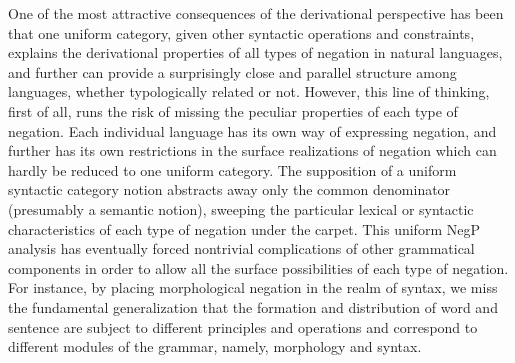 \documentclass[output=paper]{langsci/langscibook}
\begin{document}
One of the most attractive consequences of the
derivational perspective has been that one uniform category,
given other syntactic operations and constraints,
explains the derivational properties of all types of negation
in natural languages, and further can provide a surprisingly
close and parallel structure among languages, whether typologically
related or not. However, this line of thinking, first of all, runs the risk of
missing the peculiar properties of each type of
negation. Each individual language has its own
way of expressing negation, and further has
its own restrictions in the surface realizations of negation which
can hardly be reduced to one uniform category.
%
The supposition of a uniform syntactic category
notion abstracts away only the
common denominator  (presumably a semantic notion), sweeping the
particular lexical or syntactic characteristics of each type of negation
under the carpet. This uniform NegP analysis has eventually forced
nontrivial complications of other grammatical components
in order to allow all the surface
possibilities of each type of negation. For instance,
by placing morphological negation in the realm of syntax, we
miss the fundamental generalization that the formation and
distribution of word and sentence are subject to different principles
and operations and correspond to different modules of the grammar,
namely, morphology and syntax.

\end{document}
